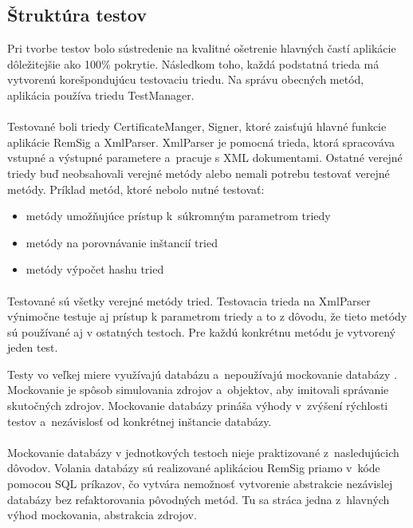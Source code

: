 \documentclass[
  digital, %
  table,   %
oneside,
  nolof,     %
  nolot,     %
]{fithesis3}
\begin{document}
\subsection{Štruktúra testov}
Pri tvorbe testov bolo sústredenie na kvalitné ošetrenie hlavných častí aplikácie dôležitejšie ako 100\% pokrytie. Následkom toho, každá podstatná trieda má vytvorenú korešpondujúcu testovaciu triedu. Na správu obecných metód, aplikácia používa triedu TestManager. \paragraph{}
Testované boli triedy CertificateManger, Signer, ktoré zaisťujú hlavné funkcie aplikácie RemSig a XmlParser. XmlParser je pomocná trieda, ktorá spracováva vstupné a výstupné parametere a~pracuje s XML dokumentami.
Ostatné verejné triedy buď neobsahovali verejné metódy alebo nemali potrebu testovať verejné metódy. Príklad metód, ktoré nebolo nutné testovať: 
\begin{itemize}	
	\item metódy umožňujúce prístup k~súkromným parametrom triedy
	\item metódy na porovnávanie inštancií tried
	\item metódy výpočet hashu tried
\end{itemize}

 \paragraph{}
Testované sú všetky verejné metódy tried. Testovacia trieda na XmlParser výnimočne testuje aj prístup k parametrom triedy a to z dôvodu, že tieto metódy sú používané aj v ostatných testoch. Pre každú konkrétnu metódu je vytvorený jeden test. 

Testy vo veľkej miere využívajú databázu a~nepoužívajú mockovanie databázy \cite{mocking}. Mockovanie je spôsob simulovania zdrojov a~objektov, aby imitovali správanie skutočných zdrojov. Mockovanie databázy prináša výhody v~zvýšení rýchlosti testov a~nezávislosť od konkrétnej inštancie databázy. \paragraph{}

Mockovanie databázy v jednotkových testoch nieje praktizované z~nasledujúcich dôvodov. Volania databázy sú realizované aplikáciou RemSig priamo v~kóde pomocou SQL príkazov, čo vytvára nemožnosť vytvorenie abstrakcie nezávislej databázy bez refaktorovania pôvodných metód. Tu sa stráca jedna z~hlavných výhod mockovania, abstrakcia zdrojov.
\end{document}
